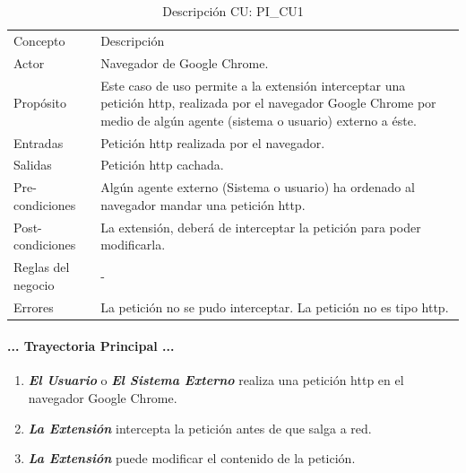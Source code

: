 \documentclass[12pt, a4paper, titlepage]{article}
\begin{document}
				\begin{table}[H]
				\begin{tabular}{ |p{3.5cm}||p{9.5cm}|}
					\hline
					\rowcolor{guindapoli}
					\multicolumn{2}{|c|}{\textbf{\textcolor{white}{Caso de uso: PI\_CU1. Interceptar petición.}}}\\
					\hline
					\rowcolor{azulfuerte}Concepto & Descripción\\
					\hline
					\cellcolor{azulclaro}Actor & 
					Navegador de Google Chrome.\\ 
					\hline
					\cellcolor{azulclaro}Propósito &
					Este caso de uso permite a la extensión interceptar una petición \acrshort{http}, realizada por el navegador Google Chrome por medio de algún agente (sistema o usuario) externo a éste.\\
					\hline
					\cellcolor{azulclaro}Entradas &
					Petición \acrshort{http} realizada por el navegador.\\
					\hline
					\cellcolor{azulclaro}Salidas &
					Petición \acrshort{http} cachada.\\
					\hline
					\cellcolor{azulclaro}Pre-condiciones&
					Algún agente externo (Sistema o usuario) ha ordenado al navegador mandar una petición \acrshort{http}.\\
					\hline
					\cellcolor{azulclaro}Post-condiciones&
					La extensión, deberá de interceptar la petición para poder modificarla.\\
					\hline
					\cellcolor{azulclaro}Reglas del negocio&
					-\\
					\hline
					\cellcolor{azulclaro}Errores &
					La petición no se pudo interceptar. \newline La petición no es tipo \acrshort{http}.\\					
					\hline
				\end{tabular}
				\caption[DCU: PI\_CU1]{Descripción CU: PI\_CU1}
				\end{table}
				
				\paragraph{... Trayectoria Principal ...}
				\begin{enumerate}
					\item \textbf{\textit{El Usuario}} o \textbf{\textit{El Sistema Externo}} realiza una petición \acrshort{http} en el navegador Google Chrome.\\
					\item \textbf{\textit{La Extensión}} intercepta la petición antes de que salga a red.\\
					\item \textbf{\textit{La Extensión}} puede modificar el contenido de la petición. \\
				\end{enumerate}
\end{document}
